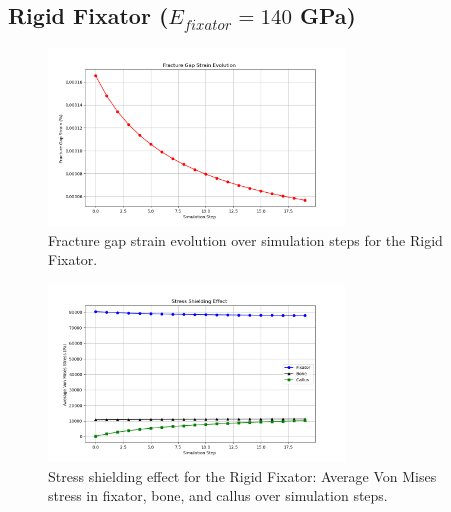 \documentclass{article}
\begin{document}
\clearpage %

\subsection{Rigid Fixator (\texorpdfstring{$E_{fixator} = 140$}{E\_fixator = 140} GPa)}

\begin{figure}[htbp]
  \centering
  \includegraphics[width=0.7\textwidth]{../output_advanced/Rigid/gap_strain.png}
  \caption{Fracture gap strain evolution over simulation steps for the Rigid Fixator.}
  \label{fig:rigid_gap_strain}
\end{figure}

\begin{figure}[htbp]
  \centering
  \includegraphics[width=0.7\textwidth]{../output_advanced/Rigid/stress_shielding.png}
  \caption{Stress shielding effect for the Rigid Fixator: Average Von Mises stress in fixator, bone, and callus over simulation steps.}
  \label{fig:rigid_stress_shielding}
\end{figure}

\clearpage
\end{document}
